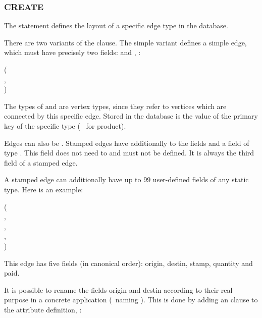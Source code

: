 \subsubsection{CREATE}
The  statement defines the layout
of a specific edge type in the database.

There are two variants of the  clause.
The simple variant defines a simple edge, which must 
have precisely two fields:
 and , \eg:

  ( \\
\hspace*{1cm} , \\
\hspace*{1cm} )

The types of  and 
are vertex types, since they refer
to vertices which are connected by this specific edge.
Stored in the database is the value of the primary key
of the specific type (\eg\  for product).

Edges can also be .
Stamped edges have additionally to the fields
 and 
a field  of type .
This field does not need to and must not be defined.
It is always the third field of a stamped edge.

A stamped edge can additionally have up to 99
user-defined fields of any static type.
Here is an example:

  ( \\
\hspace*{1cm}  , \\
\hspace*{1cm}  , \\
\hspace*{1cm}  , \\
\hspace*{1cm}  )

This edge has five fields (in canonical order):
origin, destin, stamp, quantity and paid. 

It is possible to rename the fields origin and destin
according to their real purpose in a concrete
application (\eg\ naming  ).
This is done by adding an  clause
to the attribute definition, \eg:

